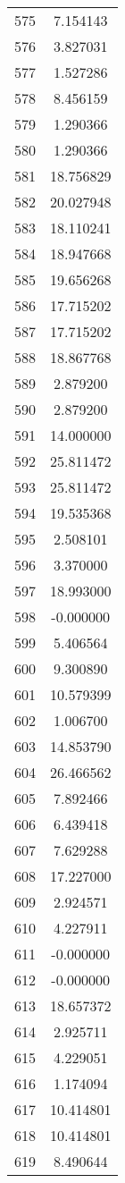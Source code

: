 \documentclass[12pt]{article}
\begin{document}
\begin{longtable}{@{}cc@{}}
575 & 7.154143 \\
576 & 3.827031 \\
577 & 1.527286 \\
578 & 8.456159 \\
579 & 1.290366 \\
580 & 1.290366 \\
581 & 18.756829 \\
582 & 20.027948 \\
583 & 18.110241 \\
584 & 18.947668 \\
585 & 19.656268 \\
586 & 17.715202 \\
587 & 17.715202 \\
588 & 18.867768 \\
589 & 2.879200 \\
590 & 2.879200 \\
591 & 14.000000 \\
592 & 25.811472 \\
593 & 25.811472 \\
594 & 19.535368 \\
595 & 2.508101 \\
596 & 3.370000 \\
597 & 18.993000 \\
598 & -0.000000 \\
599 & 5.406564 \\
600 & 9.300890 \\
601 & 10.579399 \\
602 & 1.006700 \\
603 & 14.853790 \\
604 & 26.466562 \\
605 & 7.892466 \\
606 & 6.439418 \\
607 & 7.629288 \\
608 & 17.227000 \\
609 & 2.924571 \\
610 & 4.227911 \\
611 & -0.000000 \\
612 & -0.000000 \\
613 & 18.657372 \\
614 & 2.925711 \\
615 & 4.229051 \\
616 & 1.174094 \\
617 & 10.414801 \\
618 & 10.414801 \\
619 & 8.490644 \\

\end{longtable}
\end{document}
